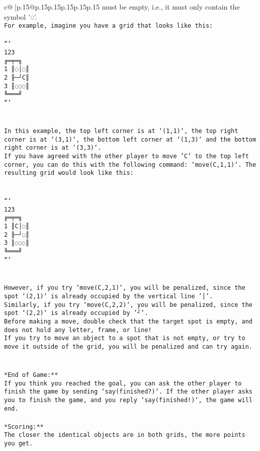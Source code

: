 \documentclass{article}
\begin{document}
{\begin{supertabular}{c@{$\;$}|p{.15\linewidth}@{}p{.15\linewidth}p{.15\linewidth}p{.15\linewidth}p{.15\linewidth}p{.15\linewidth}}
{{{must be empty, i.e., it must only contain the symbol '◌'.\\ \tt * For example, imagine you have a grid that looks like this: \\ \tt \\ \tt ```\\ \tt     123\\ \tt    ╔═╤═╗\\ \tt  1 ║◌│◌║\\ \tt  2 ╟─┘C║\\ \tt  3 ║◌◌◌║\\ \tt    ╚═══╝\\ \tt ```\\ \tt \\ \tt \\ \tt * In this example, the top left corner is at `(1,1)`, the top right corner is at `(3,1)`, the bottom left corner at `(1,3)` and the bottom right corner is at `(3,3)`.\\ \tt * If you have agreed with the other player to move 'C' to the top left corner, you can do this with the following command: `move(C,1,1)`. The resulting grid would look like this: \\ \tt \\ \tt \\ \tt ```\\ \tt     123\\ \tt    ╔═╤═╗\\ \tt  1 ║C│◌║\\ \tt  2 ╟─┘◌║\\ \tt  3 ║◌◌◌║\\ \tt    ╚═══╝\\ \tt ```\\ \tt \\ \tt \\ \tt * However, if you try `move(C,2,1)`, you will be penalized, since the spot `(2,1)` is already occupied by the vertical line '│'.\\ \tt * Similarly, if you try `move(C,2,2)`, you will be penalized, since the spot `(2,2)` is already occupied by '┘'.\\ \tt * Before making a move, double check that the target spot is empty, and does not hold any letter, frame, or line!\\ \tt * If you try to move an object to a spot that is not empty, or try to move it outside of the grid, you will be penalized and can try again.\\ \tt \\ \tt \\ \tt **End of Game:**\\ \tt If you think you reached the goal, you can ask the other player to finish the game by sending `say(finished?)`. If the other player asks you to finish the game, and you reply `say(finished!)`, the game will end.\\ \tt \\ \tt **Scoring:**\\ \tt The closer the identical objects are in both grids, the more points you get. }}}
\end{supertabular}}
\end{document}
